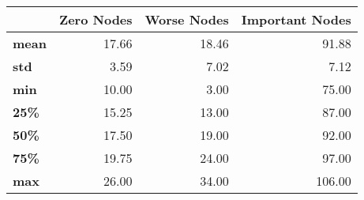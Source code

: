 \begin{tabular}{lrrr}
\toprule
{} &  Zero Nodes &  Worse Nodes &  Important Nodes \\
\midrule
\textbf{mean} &       17.66 &        18.46 &            91.88 \\
\textbf{std } &        3.59 &         7.02 &             7.12 \\
\textbf{min } &       10.00 &         3.00 &            75.00 \\
\textbf{25\% } &       15.25 &        13.00 &            87.00 \\
\textbf{50\% } &       17.50 &        19.00 &            92.00 \\
\textbf{75\% } &       19.75 &        24.00 &            97.00 \\
\textbf{max } &       26.00 &        34.00 &           106.00 \\
\bottomrule
\end{tabular}
